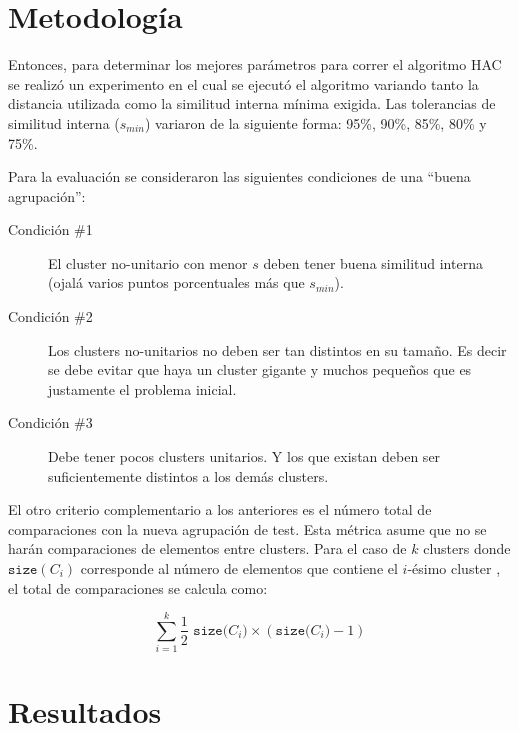 \section{Metodología}

\par Entonces, para determinar los mejores parámetros para correr el algoritmo HAC se realizó un experimento en el cual se ejecutó el algoritmo variando tanto la distancia utilizada como la similitud interna mínima exigida. Las tolerancias de similitud interna ($s_{min}$) variaron de la siguiente forma: 95\%, 90\%, 85\%, 80\% y 75\%.

\par Para la evaluación se consideraron las siguientes condiciones de una ``buena agrupación'':
\begin{description}
\item[Condición \#1] El cluster no-unitario con menor $s$ deben tener buena similitud interna (ojalá varios puntos porcentuales más que $s_{min}$).
\item[Condición \#2] Los clusters no-unitarios no deben ser tan distintos en su tamaño. Es decir se debe evitar que haya un cluster gigante y muchos pequeños que es justamente el problema inicial.
\item[Condición \#3] Debe tener pocos clusters unitarios. Y los que existan deben ser suficientemente distintos a los demás clusters.
\end{description}

\par El otro criterio complementario a los anteriores es el número total de comparaciones con la nueva agrupación de test. Esta métrica asume que no se harán comparaciones de elementos entre clusters. Para el caso de $k$ clusters donde $\texttt{size}(C_i)$ corresponde al número de elementos que contiene el $i$-ésimo cluster , el total de comparaciones se calcula como:


   \[ \sum_{i=1}^{k} \frac{1}{2} \,\, \texttt{size(}C_i\texttt{)} \times \left( \texttt{size(}C_i\texttt{)} -1 \right) \]


\section{Resultados}

